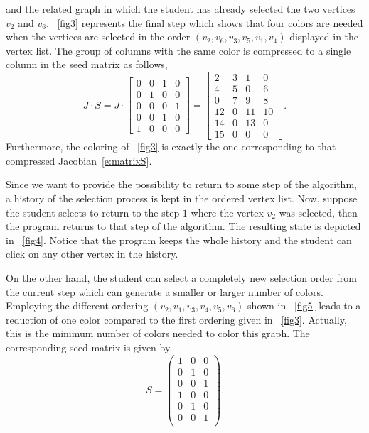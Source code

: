 \documentclass[12pt, twoside]{book}
\begin{document}
and the related graph in which the student has already selected the two vertices $v_2$ and $v_6$. \figurename~\ref{fig3} represents the final step which shows that four colors are needed when the vertices are selected in the order $(v_2, v_6, v_3, v_5, v_1, v_4)$ displayed in the vertex list. The group of columns with the same color is compressed to a single column in the seed matrix as follows,
\begin{equation}
\label{e:matrixS}
J \cdot S =
J \cdot
\begin{bmatrix}
0 & 0 & 1 & 0 \\
0 & 1 & 0 & 0 \\
0 & 0 & 0 & 1 \\
0 & 0 & 1 & 0 \\
1 & 0 & 0 & 0
\end{bmatrix}
=
\begin{bmatrix}
2 & 3 & 1 & 0 \\
4 & 5 & 0 & 6 \\
0 & 7 & 9 & 8 \\
12 & 0 & 11 & 10\\
14 & 0 & 13 & 0 \\
15 & 0 & 0 & 0
\end{bmatrix}.
\end{equation}
Furthermore, the coloring of \figurename~\ref{fig3} is exactly the one corresponding to that compressed Jacobian~\eqref{e:matrixS}.

Since we want to provide the possibility to return to some step of the algorithm, a history of the selection process is kept in the ordered vertex list. Now, suppose the student selects to return to the step $1$ where the vertex $v_2$ was selected, then the program returns to that step of the algorithm. The resulting state is depicted in \figurename~\ref{fig4}. Notice that the program keeps the whole history and the student can click on any other vertex in the history.

On the other hand, the student can select a completely new selection order from the current step which can generate a smaller or larger number of colors. Employing the different ordering $(v_2,v_1,v_3,v_4,v_5,v_6)$ shown in \figurename~\ref{fig5} leads to a reduction of one color compared to the first ordering given in \figurename~\ref{fig3}. Actually, this is the minimum number of colors needed to color this graph. The corresponding seed matrix is given by
$$
S =
\begin{pmatrix}
1 & 0 & 0 \\
0 & 1 & 0 \\
0 & 0 & 1 \\
1 & 0 & 0 \\
0 & 1 & 0 \\
0 & 0 & 1 \\
\end{pmatrix}.
$$
\end{document}
